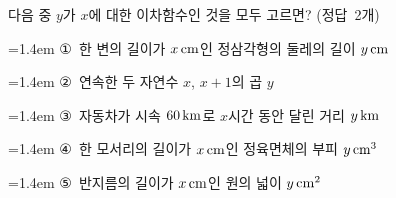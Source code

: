 다음 중 $y$가 $x$에 대한 이차함수인 것을 모두 고르면? \mbox{(정답 2개)}
\par\medskip\par\noindent\hangindent=1.4em {\small ①}\ 한 변의 길이가 $x\mkern3mu \mathrm{cm}$인 정삼각형의 둘레의 길이 $y\mkern3mu \mathrm{cm}$\par\noindent\hangindent=1.4em {\small ②}\ 연속한 두 자연수 $x$, $x+1$의 곱 $y$\par\noindent\hangindent=1.4em {\small ③}\ 자동차가 시속 $60\mkern3mu \mathrm{km}$로 $x$시간 동안 달린 거리 $y\mkern3mu \mathrm{km}$\par\noindent\hangindent=1.4em {\small ④}\ 한 모서리의 길이가 $x\mkern3mu \mathrm{cm}$인 정육면체의 부피 $y\mkern3mu \mathrm{cm}^3$\par\noindent\hangindent=1.4em {\small ⑤}\ 반지름의 길이가 $x\mkern3mu \mathrm{cm}$인 원의 넓이 $y\mkern3mu \mathrm{cm}^2$\par\medskip

